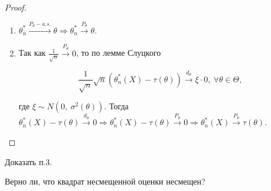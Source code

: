 \begin{proof} \
\begin{enumerate}
    \item $\displaystyle \theta _{n}^{*}\xrightarrow{P_{\theta } -a.s.} \theta \Rightarrow \theta _{n}^{*}\xrightarrow{P_{\theta }} \theta $.
    
    \item Так как $\displaystyle \frac{1}{\sqrt{n}}\xrightarrow{P_{\theta }} 0$, то по лемме Слуцкого

\begin{equation*}
\frac{1}{\sqrt{n}}\sqrt{n}\left( \theta _{n}^{*}( X) -\tau ( \theta )\right)\xrightarrow{d_{\theta }} \xi \cdotp 0,\ \forall \theta \in \Theta ,
\end{equation*}

где $\displaystyle \xi \sim N\left( 0,\ \sigma ^{2}( \theta )\right)$. Тогда $\displaystyle \theta _{n}^{*}( X) -\tau ( \theta )\xrightarrow{d_{\theta }} 0\Rightarrow \theta _{n}^{*}( X) -\tau ( \theta )\xrightarrow{P_{\theta }} 0\Rightarrow \theta _{n}^{*}( X)\xrightarrow{P_{\theta }} \tau ( \theta )$.
\end{enumerate}
\end{proof}
 
\begin{exercise}
Доказать п.3.
\end{exercise}
\begin{exercise}
Верно ли, что квадрат несмещенной оценки несмещен?
\end{exercise}

